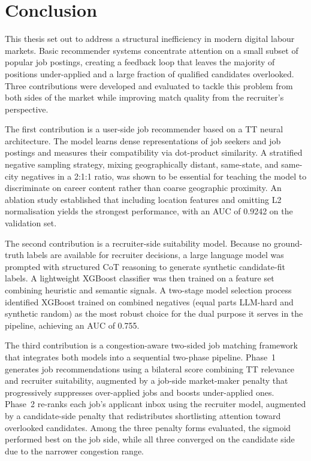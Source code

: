 \chapter{Conclusion}
\label{chap:conclusion}

This thesis set out to address a structural inefficiency in modern digital
labour markets. Basic recommender systems concentrate attention on a small 
subset of popular job postings, creating a feedback loop that leaves the 
majority of positions under-applied and a large fraction of qualified 
candidates overlooked. Three contributions were developed and evaluated to 
tackle this problem from both sides of the market while improving match quality from the recruiter's perspective.

The first contribution is a user-side job recommender based on a \gls{TT}
neural architecture. The model learns dense representations of job seekers and
job postings and measures their compatibility via dot-product similarity. A 
stratified negative sampling strategy, mixing geographically distant, 
same-state, and same-city negatives in a 2:1:1 ratio, was shown to be 
essential for teaching the model to discriminate on career content rather than 
coarse geographic proximity. An ablation study established that including 
location features and omitting L2 normalisation yields the strongest 
performance, with an \gls{AUC} of 0.9242 on the validation set.

The second contribution is a recruiter-side suitability model. Because no 
ground-truth labels are available for recruiter decisions, a large language 
model was prompted with structured \gls{CoT} reasoning to generate synthetic 
candidate-fit labels. A lightweight XGBoost classifier was then trained on a 
feature set combining heuristic and semantic signals. A two-stage model 
selection process identified XGBoost trained on combined negatives (equal 
parts LLM-hard and synthetic random) as the most robust choice for the dual 
purpose it serves in the pipeline, achieving an AUC of 0.755.

The third contribution is a congestion-aware two-sided job matching framework
that integrates both models into a sequential two-phase pipeline. Phase~1 
generates job recommendations using a bilateral score combining \gls{TT} 
relevance and recruiter suitability, augmented by a job-side market-maker 
penalty that progressively suppresses over-applied jobs and boosts 
under-applied ones. Phase~2 re-ranks each job's applicant inbox using the 
recruiter model, augmented by a candidate-side penalty that redistributes 
shortlisting attention toward overlooked candidates. Among the three penalty 
forms evaluated, the sigmoid performed best on the job side, while all three 
converged on the candidate side due to the narrower congestion range.

